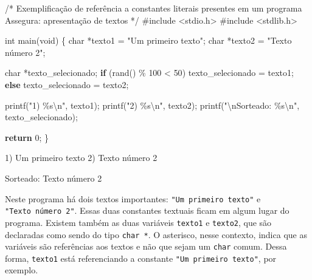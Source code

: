 \documentclass[
  letterpaper,
  DIV=11,
  numbers=noendperiod]{scrartcl}
\newenvironment{Shaded}{\begin{snugshade}}{\end{snugshade}}
\newcommand{\CommentTok}[1]{\textcolor[rgb]{0.37,0.37,0.37}{#1}}
\newcommand{\ControlFlowTok}[1]{\textcolor[rgb]{0.00,0.23,0.31}{\textbf{#1}}}
\newcommand{\DataTypeTok}[1]{\textcolor[rgb]{0.68,0.00,0.00}{#1}}
\newcommand{\DecValTok}[1]{\textcolor[rgb]{0.68,0.00,0.00}{#1}}
\newcommand{\ImportTok}[1]{\textcolor[rgb]{0.00,0.46,0.62}{#1}}
\newcommand{\NormalTok}[1]{\textcolor[rgb]{0.00,0.23,0.31}{#1}}
\newcommand{\OperatorTok}[1]{\textcolor[rgb]{0.37,0.37,0.37}{#1}}
\newcommand{\PreprocessorTok}[1]{\textcolor[rgb]{0.68,0.00,0.00}{#1}}
\newcommand{\SpecialCharTok}[1]{\textcolor[rgb]{0.37,0.37,0.37}{#1}}
\newcommand{\StringTok}[1]{\textcolor[rgb]{0.13,0.47,0.30}{#1}}
\begin{document}
\begin{Shaded}
\begin{Highlighting}[]
\CommentTok{/*}
\CommentTok{Exemplificação de referência a constantes literais presentes em um programa}
\CommentTok{Assegura: apresentação de textos}
\CommentTok{*/}
\PreprocessorTok{\#include }\ImportTok{\textless{}stdio.h\textgreater{}}
\PreprocessorTok{\#include }\ImportTok{\textless{}stdlib.h\textgreater{}}

\DataTypeTok{int}\NormalTok{ main}\OperatorTok{(}\DataTypeTok{void}\OperatorTok{)} \OperatorTok{\{}
    \DataTypeTok{char} \OperatorTok{*}\NormalTok{texto1 }\OperatorTok{=} \StringTok{"Um primeiro texto"}\OperatorTok{;}
    \DataTypeTok{char} \OperatorTok{*}\NormalTok{texto2 }\OperatorTok{=} \StringTok{"Texto número 2"}\OperatorTok{;}

    \DataTypeTok{char} \OperatorTok{*}\NormalTok{texto\_selecionado}\OperatorTok{;}
    \ControlFlowTok{if} \OperatorTok{(}\NormalTok{rand}\OperatorTok{()} \OperatorTok{\%} \DecValTok{100} \OperatorTok{\textless{}} \DecValTok{50}\OperatorTok{)}
\NormalTok{        texto\_selecionado }\OperatorTok{=}\NormalTok{ texto1}\OperatorTok{;}
    \ControlFlowTok{else}
\NormalTok{        texto\_selecionado }\OperatorTok{=}\NormalTok{ texto2}\OperatorTok{;}

\NormalTok{    printf}\OperatorTok{(}\StringTok{"1) }\SpecialCharTok{\%s\textbackslash{}n}\StringTok{"}\OperatorTok{,}\NormalTok{ texto1}\OperatorTok{);}
\NormalTok{    printf}\OperatorTok{(}\StringTok{"2) }\SpecialCharTok{\%s\textbackslash{}n}\StringTok{"}\OperatorTok{,}\NormalTok{ texto2}\OperatorTok{);}
\NormalTok{    printf}\OperatorTok{(}\StringTok{"}\SpecialCharTok{\textbackslash{}n}\StringTok{Sorteado: }\SpecialCharTok{\%s\textbackslash{}n}\StringTok{"}\OperatorTok{,}\NormalTok{ texto\_selecionado}\OperatorTok{);}

    \ControlFlowTok{return} \DecValTok{0}\OperatorTok{;}
\OperatorTok{\}}
\end{Highlighting}
\end{Shaded}

\begin{Shaded}
\begin{Highlighting}[]
\NormalTok{1) Um primeiro texto}
\NormalTok{2) Texto número 2}

\NormalTok{Sorteado: Texto número 2}
\end{Highlighting}
\end{Shaded}

Neste programa há dois textos importantes:
\texttt{"Um\ primeiro\ texto"} e \texttt{"Texto\ número\ 2"}. Essas duas
constantes textuais ficam em algum lugar do programa. Existem também as
duas variáveis \texttt{texto1} e \texttt{texto2}, que são declaradas
como sendo do tipo \texttt{char\ *}. O asterisco, nesse contexto, indica
que as variáveis são referências aos textos e não que sejam um
\texttt{char} comum. Dessa forma, \texttt{texto1} está referenciando a
constante \texttt{"Um\ primeiro\ texto"}, por exemplo.
\end{document}
